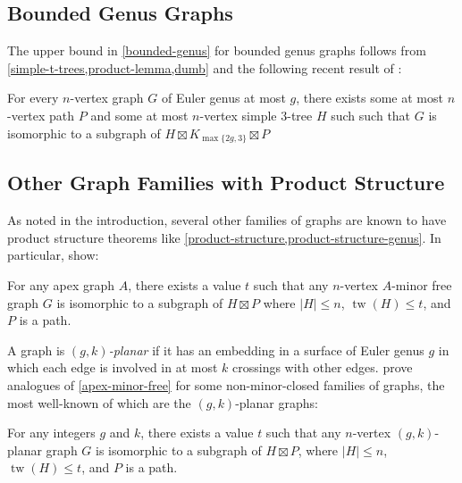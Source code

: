 \documentclass[kpfonts]{patmorin}
\DeclareMathOperator{\tw}{tw}
\theoremstyle{named}
\begin{document}
\subsection{Bounded Genus Graphs}


The upper bound in \cref{bounded-genus} for bounded genus graphs follows from \cref{simple-t-trees,product-lemma,dumb} and the following recent result of \citet{distel.hickingbotham.ea:improved}:

\begin{thm} \label{product-structure-genus}
    For every $n$-vertex graph $G$ of Euler genus at most $g$, there exists some at most $n$-vertex path $P$ and some at most $n$-vertex simple $3$-tree $H$ such such that $G$ is isomorphic to a subgraph of $H\boxtimes K_{\max\{2g,3\}}\boxtimes P$
\end{thm}

\subsection{Other Graph Families with Product Structure}

As noted in the introduction, several other families of graphs are known to have product structure theorems like \cref{product-structure,product-structure-genus}.  In particular, \citet{dujmovic.joret.ea:planar} show:

\begin{thm}\label{apex-minor-free}
    For any apex graph $A$, there exists a value $t$ such that any $n$-vertex $A$-minor free graph $G$ is isomorphic to a subgraph of $H\boxtimes P$ where $|H|\le n$, $\tw(H)\le t$, and $P$ is a path.
\end{thm}

A graph is \emph{$(g,k)$-planar} if it has an embedding in a surface of Euler genus $g$ in which each edge is involved in at most $k$ crossings with other edges.  \citet{dujmovic.morin.ea:structure} prove analogues of \cref{apex-minor-free} for some non-minor-closed families of graphs, the most well-known of which are the $(g,k)$-planar graphs:

\begin{thm}\label{gk-planar}
    For any integers $g$ and $k$, there exists a value $t$ such that any $n$-vertex $(g,k)$-planar graph $G$ is isomorphic to a subgraph of $H\boxtimes P$, where $|H|\le n$, $\tw(H)\le t$, and $P$ is a path.
\end{thm}
\end{document}
